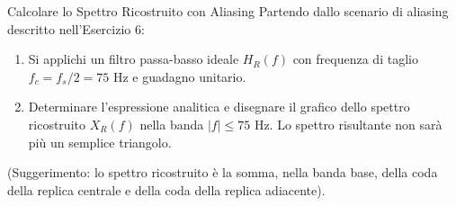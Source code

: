 
\begin{esercizio}{Calcolare lo Spettro Ricostruito con Aliasing}
    Partendo dallo scenario di aliasing descritto nell'Esercizio 6:
    
    \begin{enumerate}
        \item Si applichi un filtro passa-basso ideale $H_R(f)$ con frequenza di taglio $f_c = f_s/2 = 75$ Hz e guadagno unitario.
        \item Determinare l'espressione analitica e disegnare il grafico dello spettro ricostruito $X_R(f)$ nella banda $|f| \leq 75$ Hz. Lo spettro risultante non sarà più un semplice triangolo.
    \end{enumerate}
    
    (Suggerimento: lo spettro ricostruito è la somma, nella banda base, della coda della replica centrale e della coda della replica adiacente).
\end{esercizio}